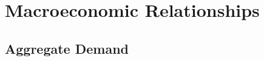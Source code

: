 \documentclass[10pt]{article}
\begin{document}




\section{Macroeconomic Relationships}

  \subsection{Aggregate Demand}
\end{document}
